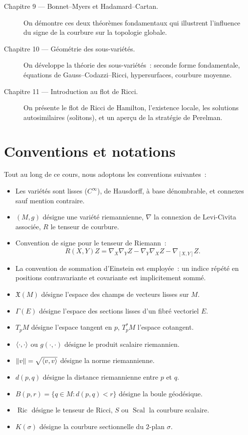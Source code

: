 \begin{description}
    \item[Chapitre 9 --- Bonnet--Myers et Hadamard--Cartan.]
    On d\'emontre ces deux th\'eor\`emes fondamentaux qui illustrent l'influence
    du signe de la courbure sur la topologie globale.

    \item[Chapitre 10 --- G\'eom\'etrie des sous-vari\'et\'es.]
    On d\'eveloppe la th\'eorie des sous-vari\'et\'es~: seconde forme fondamentale,
    \'equations de Gauss--Codazzi--Ricci, hypersurfaces, courbure moyenne.

    \item[Chapitre 11 --- Introduction au flot de Ricci.]
    On pr\'esente le flot de Ricci de Hamilton, l'existence locale, les solutions
    autosimilaires (solitons), et un aper\c{c}u de la strat\'egie de Perelman.
\end{description}

\section*{Conventions et notations}

Tout au long de ce cours, nous adoptons les conventions suivantes~:
\begin{itemize}
    \item Les vari\'et\'es sont lisses ($C^\infty$), de Hausdorff, \`a base
          d\'enombrable, et connexes sauf mention contraire.
    \item $(M, g)$ d\'esigne une vari\'et\'e riemannienne, $\nabla$ la connexion de
          Levi-Civita associ\'ee, $R$ le tenseur de courbure.
    \item Convention de signe pour le tenseur de Riemann~:
          \[
              R(X,Y)Z = \nabla_X \nabla_Y Z - \nabla_Y \nabla_X Z - \nabla_{[X,Y]} Z.
          \]
    \item La convention de sommation d'Einstein est employ\'ee~: un indice r\'ep\'et\'e
          en positions contravariante et covariante est implicitement somm\'e.
    \item $\mathfrak{X}(M)$ d\'esigne l'espace des champs de vecteurs lisses sur $M$.
    \item $\Gamma(E)$ d\'esigne l'espace des sections lisses d'un fibr\'e vectoriel $E$.
    \item $T_pM$ d\'esigne l'espace tangent en $p$, $T^*_pM$ l'espace cotangent.
    \item $\langle \cdot, \cdot \rangle$ ou $g(\cdot, \cdot)$ d\'esigne le produit scalaire riemannien.
    \item $\left\| v \right\| = \sqrt{\langle v, v \rangle}$ d\'esigne la norme riemannienne.
    \item $d(p,q)$ d\'esigne la distance riemannienne entre $p$ et $q$.
    \item $B(p,r) = \{q \in M : d(p,q) < r\}$ d\'esigne la boule g\'eod\'esique.
    \item $\operatorname{Ric}$ d\'esigne le tenseur de Ricci, $S$ ou $\operatorname{Scal}$
          la courbure scalaire.
    \item $K(\sigma)$ d\'esigne la courbure sectionnelle du $2$-plan $\sigma$.
\end{itemize}

